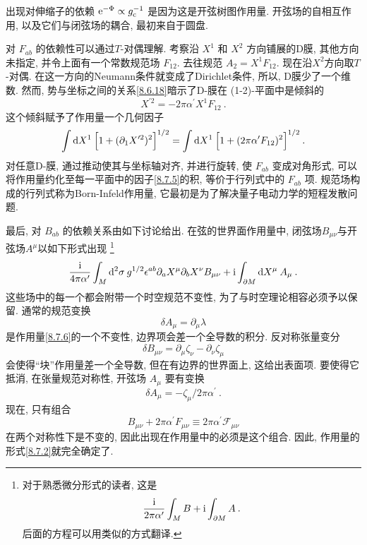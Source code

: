 出现对伸缩子的依赖 $\mathrm{e}^{-\Phi} \propto g_{\mathrm{c}}^{-1}$ 是因为这是开弦树图作用量. 
开弦场的自相互作用, 以及它们与闭弦场的耦合, 最初来自于圆盘.

对 $F_{ab}$ 的依赖性可以通过$T$-对偶理解. 考察沿 $X^{1}$ 和 $X^{2}$ 方向铺展的D膜, 其他方向未指定, 并令上面有一个常数规范场 $F_{12}$. 
去往规范 $A_{2}=X^{1} F_{12}$. 现在沿$X^{2}$方向取$T$-对偶. 在这一方向的Neumann条件就变成了Dirichlet条件, 所以, D膜少了一个维数. 
然而, 势与坐标之间的关系\eqref{8.6.18}暗示了D-膜在 (1-2)-平面中是倾斜的
\begin{equation}
	X^{\prime 2}=-2 \pi \alpha^{\prime} X^{1} F_{12} \:. \label{8.7.4}
\end{equation}
这个倾斜赋予了作用量一个几何因子
\begin{equation}
	 \int \mathrm{d} X^{1}\: \Bigl[1 + (\partial_{1} X^{\prime 2})^{2}\Bigr]^{1/2} 
	=\int \mathrm{d} X^{1}\: \Bigl[1 + (2 \pi \alpha^{\prime} F_{12})^{2}\Bigr]^{1/2} \:. \label{8.7.5}
\end{equation}
对任意D-膜, 通过推动使其与坐标轴对齐, 并进行旋转, 使 $F_{ab}$ 变成对角形式, 可以将作用量约化至每一平面中的因子\eqref{8.7.5}的积, 
等价于行列式中的 $F_{ab}$ 项. 规范场构成的行列式称为Born-Infeld作用量, 它最初是为了解决量子电动力学的短程发散问题.

最后, 对 $B_{ab}$ 的依赖关系由如下讨论给出. 在弦的世界面作用量中, 闭弦场$B_{\mu \nu}$与开弦场$A^{\mu}$以如下形式出现
\footnote{对于熟悉微分形式的读者, 这是
	\[ \frac{\mathrm{i}}{2 \pi \alpha^{\prime}} \int_{M} B + \mathrm{i} \int_{\partial M} A \:. \]
后面的方程可以用类似的方式翻译.}
\begin{equation}
	\frac{\mathrm{i}}{4 \pi \alpha^{\prime}} \int_{M} \mathrm{d}^{2} \sigma \: g^{1/2} \epsilon^{ab} \partial_{a} X^{\mu} \partial_{b} X^{\nu} 
	B_{\mu\nu} + \mathrm{i} \int_{\partial M} \mathrm{d} X^{\mu} \:A_{\mu} \:. \label{8.7.6}
\end{equation}
这些场中的每一个都会附带一个时空规范不变性, 为了与时空理论相容必须予以保留. 通常的规范变换
\begin{equation}
	\delta A_{\mu}=\partial_{\mu} \lambda \label{8.7.7}
\end{equation}
是作用量\eqref{8.7.6}的一个不变性, 边界项会差一个全导数的积分. 反对称张量变分
\begin{equation}
	\delta B_{\mu \nu} = \partial_{\mu} \zeta_{\nu} - \partial_{\nu} \zeta_{\mu} \label{8.7.8}
\end{equation}
会使得``块''作用量差一个全导数, 但在有边界的世界面上, 这给出表面项. 要使得它抵消, 在张量规范对称性, 开弦场 $A_{\mu}$ 要有变换
\begin{equation}
	\delta A_{\mu}=-\zeta_{\mu} / 2 \pi \alpha^{\prime} \:. \label{8.7.9}
\end{equation}
现在, 只有组合
\begin{equation}
	B_{\mu \nu}+2 \pi \alpha^{\prime} F_{\mu \nu} \equiv 2 \pi \alpha^{\prime} \mathscr{F}_{\mu \nu}  \label{8.7.10}
\end{equation}
在两个对称性下是不变的, 因此出现在作用量中的必须是这个组合. 因此, 作用量的形式\eqref{8.7.2}就完全确定了.

